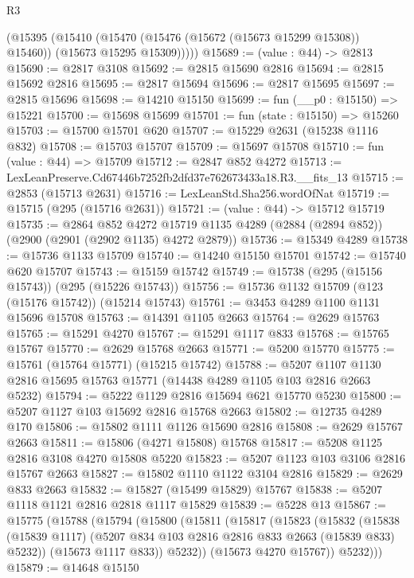 \begin{lexlean}{R3}
\begin{coremodule}
        (@15395
          (@15410
            (@15470 (@15476 (@15672 (@15673 @15299 @15308)) @15460))
            (@15673 @15295 @15309)))))
@15689 := (value : @44) -> @2813
@15690 := @2817 @3108
@15692 := @2815 @15690 @2816
@15694 := @2815 @15692 @2816
@15695 := @2817 @15694
@15696 := @2817 @15695
@15697 := @2815 @15696
@15698 := @14210 @15150
@15699 := fun (__p0 : @15150) => @15221
@15700 := @15698 @15699
@15701 := fun (state : @15150) => @15260
@15703 := @15700 @15701 @620
@15707 := @15229 @2631 (@15238 @1116 @832)
@15708 := @15703 @15707
@15709 := @15697 @15708
@15710 := fun (value : @44) => @15709
@15712 := @2847 @852 @4272
@15713 := LexLeanPreserve.Cd67446b7252fb2dfd37e762673433a18.R3.__fits_13
@15715 := @2853 (@15713 @2631)
@15716 := LexLeanStd.Sha256.wordOfNat
@15719 := @15715 (@295 (@15716 @2631))
@15721 := (value : @44) -> @15712 @15719
@15735 := @2864
    @852
    @4272
    @15719
    @1135
    @4289
    (@2884 (@2894 @852))
    (@2900 (@2901 (@2902 @1135) @4272 @2879))
@15736 := @15349 @4289
@15738 := @15736 @1133 @15709
@15740 := @14240 @15150 @15701
@15742 := @15740 @620 @15707
@15743 := @15159 @15742
@15749 := @15738 (@295 (@15156 @15743)) (@295 (@15226 @15743))
@15756 := @15736 @1132 @15709 (@123 (@15176 @15742)) (@15214 @15743)
@15761 := @3453 @4289 @1100 @1131 @15696 @15708
@15763 := @14391 @1105 @2663
@15764 := @2629 @15763
@15765 := @15291 @4270
@15767 := @15291 @1117 @833
@15768 := @15765 @15767
@15770 := @2629 @15768 @2663
@15771 := @5200 @15770
@15775 := @15761 (@15764 @15771) (@15215 @15742)
@15788 := @5207 @1107 @1130 @2816 @15695 @15763 @15771 (@14438 @4289 @1105 @103 @2816 @2663 @5232)
@15794 := @5222 @1129 @2816 @15694 @621 @15770 @5230
@15800 := @5207 @1127 @103 @15692 @2816 @15768 @2663
@15802 := @12735 @4289 @170
@15806 := @15802 @1111 @1126 @15690 @2816
@15808 := @2629 @15767 @2663
@15811 := @15806 (@4271 @15808) @15768
@15817 := @5208 @1125 @2816 @3108 @4270 @15808 @5220
@15823 := @5207 @1123 @103 @3106 @2816 @15767 @2663
@15827 := @15802 @1110 @1122 @3104 @2816
@15829 := @2629 @833 @2663
@15832 := @15827 (@15499 @15829) @15767
@15838 := @5207 @1118 @1121 @2816 @2818 @1117 @15829
@15839 := @5228 @13
@15867 := @15775
    (@15788
      (@15794
        (@15800
          (@15811
            (@15817
              (@15823
                (@15832
                  (@15838
                    (@15839 @1117)
                    (@5207 @834 @103 @2816 @2816 @833 @2663 (@15839 @833) @5232))
                  (@15673 @1117 @833))
                @5232))
            (@15673 @4270 @15767))
          @5232)))
@15879 := @14648
    @15150

\end{coremodule}
\end{lexlean}
